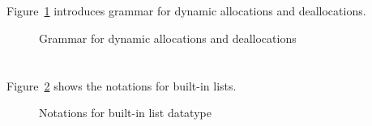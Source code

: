 \subsection{}
\label{sec:alloc-dealloc}
\nodiff


Figure~\ref{fig:gram:allocation} introduces grammar for dynamic allocations and
deallocations.

\begin{figure}[htp]
  \begin{cadre}
      
    \end{cadre}
  \caption{Grammar for dynamic allocations and deallocations}
\label{fig:gram:allocation}
\end{figure}


\section{}

\subsection{}
\nodiff

\subsection{}
\nodiff

Figure~\ref{fig:gram:list} shows the notations for built-in lists.
\begin{figure}[t]
  \begin{cadre}
      
    \end{cadre}
  \caption{Notations for built-in list datatype}
\label{fig:gram:list}
\end{figure}



